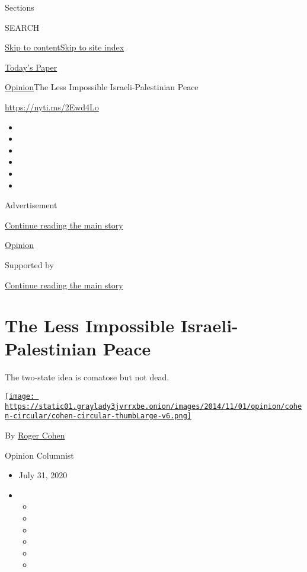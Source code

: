 Sections

SEARCH

\protect\hyperlink{site-content}{Skip to
content}\protect\hyperlink{site-index}{Skip to site index}

\href{https://myaccount.nytimes3xbfgragh.onion/auth/login?response_type=cookie\&client_id=vi}{}

\href{https://www.nytimes3xbfgragh.onion/section/todayspaper}{Today's
Paper}

\href{/section/opinion}{Opinion}\textbar{}The Less Impossible
Israeli-Palestinian Peace

\url{https://nyti.ms/2Ewd4Lo}

\begin{itemize}
\item
\item
\item
\item
\item
\item
\end{itemize}

Advertisement

\protect\hyperlink{after-top}{Continue reading the main story}

\href{/section/opinion}{Opinion}

Supported by

\protect\hyperlink{after-sponsor}{Continue reading the main story}

\hypertarget{the-less-impossible-israeli-palestinian-peace}{%
\section{The Less Impossible Israeli-Palestinian
Peace}\label{the-less-impossible-israeli-palestinian-peace}}

The two-state idea is comatose but not dead.

\href{https://www.nytimes3xbfgragh.onion/by/roger-cohen}{\texttt{[image: https://static01.graylady3jvrrxbe.onion/images/2014/11/01/opinion/cohen-circular/cohen-circular-thumbLarge-v6.png]}}

By \href{https://www.nytimes3xbfgragh.onion/by/roger-cohen}{Roger Cohen}

Opinion Columnist

\begin{itemize}
\item
  July 31, 2020
\item
  \begin{itemize}
  \item
  \item
  \item
  \item
  \item
  \item
  \end{itemize}
\end{itemize}

